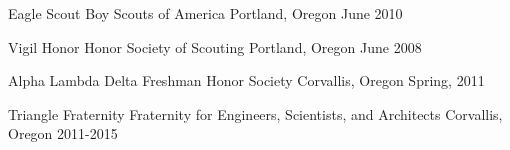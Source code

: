 



\begin{cvhonors}

  \cvhonor
    {Eagle Scout} %
    {Boy Scouts of America} %
    {Portland, Oregon} %
    {June 2010} %

  \cvhonor
    {Vigil Honor} %
    {Honor Society of Scouting} %
    {Portland, Oregon} %
    {June 2008} %

  \cvhonor
    {Alpha Lambda Delta} %
    {Freshman Honor Society} %
    {Corvallis, Oregon} %
    {Spring, 2011} %

  \cvhonor
    {Triangle Fraternity} %
    {Fraternity for Engineers, Scientists, and Architects} %
    {Corvallis, Oregon} %
    {2011-2015} %

\end{cvhonors}



